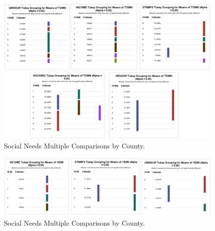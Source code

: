 \documentclass[12pt]{article}
\begin{document}
\begin{figure}[tbp]
  \label{fig:Social Needs by County Graph}
    \centering
    \includegraphics[width=\textwidth]{Multiple Comparisons by County.pdf}
    \caption{Social Needs Multiple Comparisons by County.}
  \end{figure}

  \begin{figure}[tbp]
    \label{fig:Social Needs by YearGraph}
      \centering
      \includegraphics[width=\textwidth]{Social Need by Year.pdf}
      \caption{Social Needs Multiple Comparisons by County.}
    \end{figure}
\end{document}
